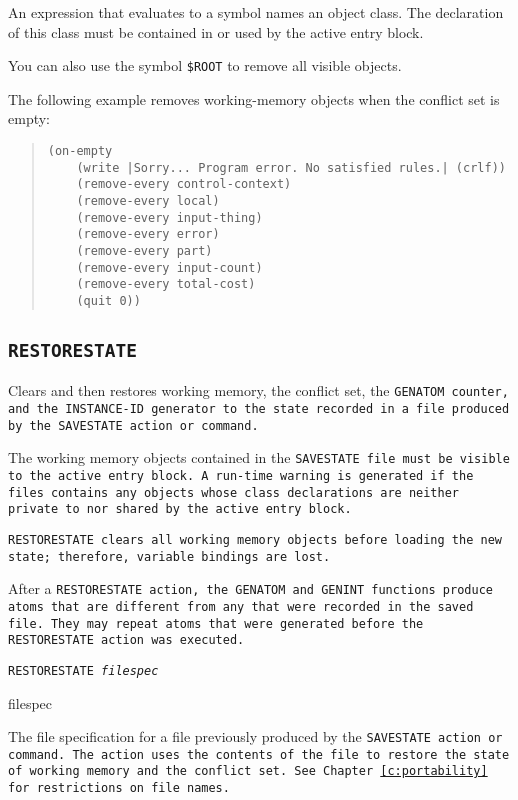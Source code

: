 {{\begin{arguments}
  An expression that evaluates to a symbol names an object class. The
  declaration of this class must be contained in or used by the active
  entry block.

  You can also use the symbol
  \verb|$ROOT| to remove all visible objects.
\end{arguments}

\Example

The following example removes working-memory objects when the conflict
set is empty:

\begin{quote}
\begin{verbatim}
(on-empty
    (write |Sorry... Program error. No satisfied rules.| (crlf))
    (remove-every control-context)
    (remove-every local)
    (remove-every input-thing)
    (remove-every error)
    (remove-every part)
    (remove-every input-count)
    (remove-every total-cost)
    (quit 0))
\end{verbatim}
\end{quote}

\subsection{\tt{RESTORESTATE}}

Clears and then restores working memory, the conflict set, the \tt{GENATOM}
counter, and the \tt{INSTANCE-ID} generator to the state recorded in a file
produced by the \tt{SAVESTATE} action or command.

The working memory objects contained in the \tt{SAVESTATE} file must be
visible to the active entry block. A run-time warning is generated if
the files contains any objects whose class declarations are neither
private to nor shared by the active entry block.

\tt{RESTORESTATE} clears all working memory objects before loading the
new state; therefore, variable bindings are lost.

After a \tt{RESTORESTATE} action, the \tt{GENATOM} and \tt{GENINT} functions
produce atoms that are different from any that were recorded
in the saved file. They may repeat atoms that were generated
before the \tt{RESTORESTATE} action was executed.

\Format

\tt{RESTORESTATE} \it{filespec}

\begin{arguments}
\item[filespec]

  The file specification for a file previously produced by the
  \tt{SAVESTATE} action or command. The action uses the contents of
  the file to restore the state of working memory and the conflict
  set. See Chapter~\ref{c:portability} for restrictions on file names.
\end{arguments}

}}
